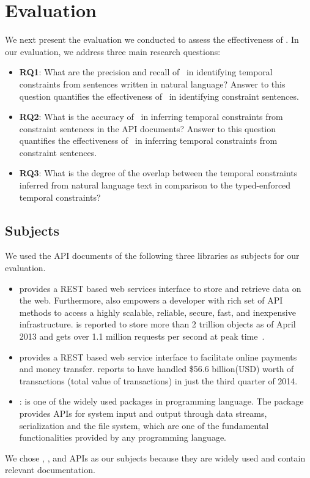 \section{Evaluation}
\label{sec:evaluation}

We next present the evaluation we conducted to assess the effectiveness of \tool. In our evaluation, we address three main research questions:

\begin{itemize}
	\item\textbf{RQ1}: What are the precision and recall of \tool\ in identifying temporal constraints from sentences written in natural language?
	Answer to this question quantifies the effectiveness of \tool\ in identifying constraint sentences.
	\item\textbf{RQ2}: What is the accuracy of \tool\ in inferring temporal constraints from constraint sentences in the API documents?
	Answer to this question quantifies the effectiveness of \tool\ in inferring temporal constraints from constraint sentences. 
	\item\textbf{RQ3}: What is the degree of the overlap between the temporal constraints inferred from natural language text in comparison to the typed-enforced temporal constraints?
	
 
\end{itemize}

\subsection{Subjects}
\label{sub:subject}

We used the API documents of the following three libraries as subjects for our evaluation. 
\begin{itemize}
	\item \amazonAPI\: provides a REST based web services interface to store and retrieve data on the web.
	Furthermore,  also empowers a developer with rich set of API methods to access a highly scalable, reliable, secure, fast, and inexpensive infrastructure. 
	 is reported to store more than 2 trillion objects as of April 2013 and gets over 1.1 million requests per second at peak time~\cite{amazons3stats}.
	
	\item \paypalAPI\: provides a REST based web service interface to facilitate online payments and money transfer.
	 reports to have handled \$56.6 billion(USD) worth of transactions (total value of transactions) in just the third quarter of 2014. 
	
	\item{} : is one of the widely used packages in  programming language. The package provides APIs for system input and output through data streams, serialization and the file system, which are one of the fundamental functionalities provided by any programming language.
\end{itemize}
We chose , , and  APIs as our subjects because they are widely used and contain relevant documentation.

